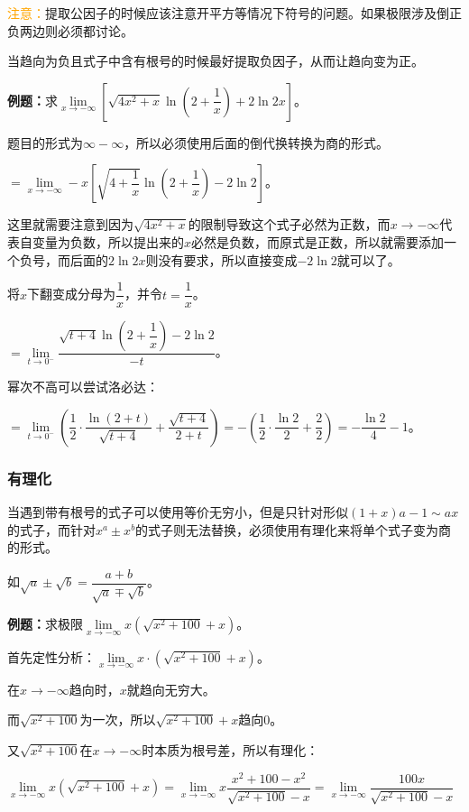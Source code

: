 \documentclass[UTF8, 12pt]{ctexart}
\begin{document}
\textcolor{orange}{注意：}提取公因子的时候应该注意开平方等情况下符号的问题。如果极限涉及倒正负两边则必须都讨论。

当趋向为负且式子中含有根号的时候最好提取负因子，从而让趋向变为正。\medskip

\textbf{例题：}求$\lim\limits_{x\to-\infty}\left[\sqrt{4x^2+x}\ln\left(2+\dfrac{1}{x}\right)+2\ln 2x\right]$。\medskip

题目的形式为$\infty-\infty$，所以必须使用后面的倒代换转换为商的形式。\medskip

$=\lim\limits_{x\to-\infty}-x\left[\sqrt{4+\dfrac{1}{x}}\ln\left(2+\dfrac{1}{x}\right)-2\ln 2\right]$。 \medskip

这里就需要注意到因为$\sqrt{4x^2+x}$的限制导致这个式子必然为正数，而$x\to-\infty$代表自变量为负数，所以提出来的$x$必然是负数，而原式是正数，所以就需要添加一个负号，而后面的$2\ln 2x$则没有要求，所以直接变成$-2\ln 2$就可以了。

将$x$下翻变成分母为$\dfrac{1}{x}$，并令$t=\dfrac{1}{x}$。\medskip

$=\lim\limits_{t\to 0^-}\dfrac{\sqrt{t+4}\ln\left(2+\dfrac{1}{x}\right)-2\ln 2}{-t}$。\medskip

幂次不高可以尝试洛必达：\medskip

$=\lim\limits_{t\to 0^-}\left(\dfrac{1}{2}\cdot\dfrac{\ln(2+t)}{\sqrt{t+4}}+\dfrac{\sqrt{t+4}}{2+t}\right)=-\left(\dfrac{1}{2}\cdot\dfrac{\ln 2}{2}+\dfrac{2}{2}\right)=-\dfrac{\ln 2}{4}-1$。

\subsubsection{有理化}

当遇到带有根号的式子可以使用等价无穷小，但是只针对形似$(1+x)a-1\sim ax$的式子，而针对$x^a\pm x^b$的式子则无法替换，必须使用有理化来将单个式子变为商的形式。

如$\sqrt{a}\pm\sqrt{b}=\dfrac{a+b}{\sqrt{a}\mp\sqrt{b}}$。\medskip

\textbf{例题：}求极限$\lim\limits_{x\to-\infty}x(\sqrt{x^2+100}+x)$。

首先定性分析：$\lim\limits_{x\to-\infty}x\cdot(\sqrt{x^2+100}+x)$。

在$x\to-\infty$趋向时，$x$就趋向无穷大。

而$\sqrt{x^2+100}$为一次，所以$\sqrt{x^2+100}+x$趋向0。

又$\sqrt{x^2+100}$在$x\to-\infty$时本质为根号差，所以有理化：

$\lim\limits_{x\to-\infty}x(\sqrt{x^2+100}+x)=\lim\limits_{x\to-\infty}x\dfrac{x^2+100-x^2}{\sqrt{x^2+100}-x}=\lim\limits_{x\to-\infty}\dfrac{100x}{\sqrt{x^2+100}-x}$\medskip
\end{document}
